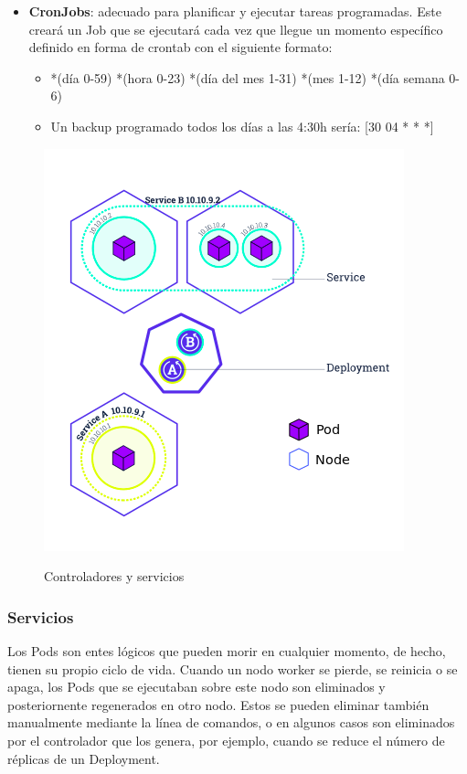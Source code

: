 \documentclass[spanish,twoside,12pt,a4paper]{book}
\begin{document}
\begin{itemize}
	\item \textbf{CronJobs}: adecuado para planificar y ejecutar tareas programadas. Este creará un Job que se ejecutará cada vez que llegue un momento específico definido en forma de crontab con el siguiente formato:
	\begin{itemize}
	    \item *(día 0-59) *(hora 0-23) *(día del mes 1-31) *(mes 1-12) *(día semana 0-6)
	    \item Un backup programado todos los días a las 4:30h sería:  [30 04 * * *] 
	\end{itemize}
\end{itemize}

\begin{figure}
    \centering
	\includegraphics[scale=0.6]{img/module_04_services.png}
	\label{fig:controllers}
	\caption{Controladores y servicios}
\end{figure}

\subsubsection{Servicios}

Los Pods son entes lógicos que pueden morir en cualquier momento, de hecho, tienen su propio ciclo de vida. Cuando un nodo worker se pierde, se reinicia o se apaga, los Pods que se ejecutaban sobre este nodo son eliminados y posteriornente regenerados en otro nodo. Estos se pueden eliminar también manualmente mediante la línea de comandos, o en algunos casos son eliminados por el controlador que los genera, por ejemplo, cuando se reduce el número de réplicas de un Deployment.
\end{document}
